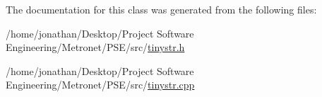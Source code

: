 The documentation for this class was generated from the following files\+:\begin{DoxyCompactItemize}
\item 
/home/jonathan/\+Desktop/\+Project Software Engineering/\+Metronet/\+P\+S\+E/src/\hyperlink{tinystr_8h}{tinystr.\+h}\item 
/home/jonathan/\+Desktop/\+Project Software Engineering/\+Metronet/\+P\+S\+E/src/\hyperlink{tinystr_8cpp}{tinystr.\+cpp}\end{DoxyCompactItemize}
